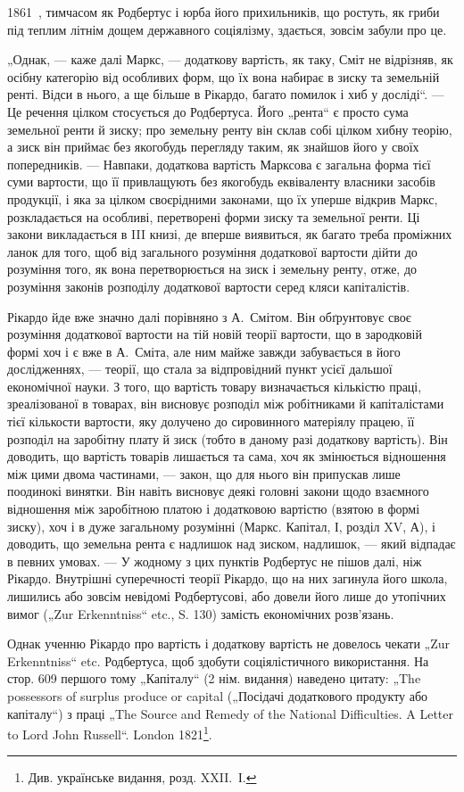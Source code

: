 \parcont{}  %
1861~, тимчасом як Родбертус і юрба його прихильників, що ростуть,
як гриби під теплим літнім дощем державного соціялізму, здається, зовсім
забули про це.

„Однак, — каже далі Маркс, — додаткову вартість, як таку, Сміт не
відрізняв, як осібну категорію від особливих форм, що їх вона набирає
в зиску та земельній ренті. Відси в нього, а ще більше в Рікардо, багато
помилок і хиб у досліді“. — Це речення цілком стосується до Родбертуса.
Його „рента“ є просто сума земельної ренти й зиску; про земельну
ренту він склав собі цілком хибну теорію, а зиск він приймає без якогобудь
перегляду таким, як знайшов його у своїх попередників. — Навпаки,
додаткова вартість Марксова є загальна форма тієї суми вартости, що
її привлащують без якогобудь еквіваленту власники засобів продукції,
і яка за цілком своєрідними законами, що їх уперше відкрив Маркс,
розкладається на особливі, перетворені форми зиску та земельної ренти.
Ці закони викладається в III книзі, де вперше виявиться, як багато треба
проміжних ланок для того, щоб від загального розуміння додаткової
вартости дійти до розуміння того, як вона перетворюється на зиск і
земельну ренту, отже, до розуміння законів розподілу додаткової вартости
серед кляси капіталістів.

Рікардо йде вже значно далі порівняно з А.~Смітом. Він обґрунтовує
своє розуміння додаткової вартости на тій новій теорії вартости, що в
зародковій формі хоч і є вже в А.~Сміта, але ним майже завжди забувається
в його дослідженнях, — теорії, що стала за відпровідний пункт
усієї дальшої економічної науки. З того, що вартість товару визначається
кількістю праці, зреалізованої в товарах, він висновує розподіл між
робітниками й капіталістами тієї кількости вартости, яку долучено до
сировинного матеріялу працею, її розподіл на заробітну плату й зиск
(тобто в даному разі додаткову вартість). Він доводить, що вартість
товарів лишається та сама, хоч як змінюється відношення між цими двома
частинами, — закон, що для нього він припускав лише поодинокі винятки.
Він навіть висновує деякі головні закони щодо взаємного відношення між
заробітною платою і додатковою вартістю (взятою в формі зиску), хоч і в
дуже загальному розумінні (Маркс. Капітал, І, розділ XV, А), і доводить, що
земельна рента є надлишок над зиском, надлишок, — який відпадає в певних
умовах. — У жодному з цих пунктів Родбертус не пішов далі, ніж Рікардо.
Внутрішні суперечності теорії Рікардо, що на них загинула його школа, лишились
або зовсім невідомі Родбертусові, або довели його лише до утопічних
вимог („Zur Erkenntniss“ etc., S. 130) замість економічних розв’язань.

Однак ученню Рікардо про вартість і додаткову вартість не довелось
чекати „Zur Erkenntniss“ etc. Родбертуса, щоб здобути соціялістичного
використання. На стор. 609 першого тому „Капіталу“ (2 нім. видання)
наведено цитату: „The possessors of surplus produce or capital („Посідачі
додаткового продукту або капіталу“) з праці „The Source and Remedy of
the National Difficulties. A Letter to Lord John Russell“. London 1821\footnote*{
Див. українське видання, розд. XXII.~І. 
}.
\parbreak{}  %
